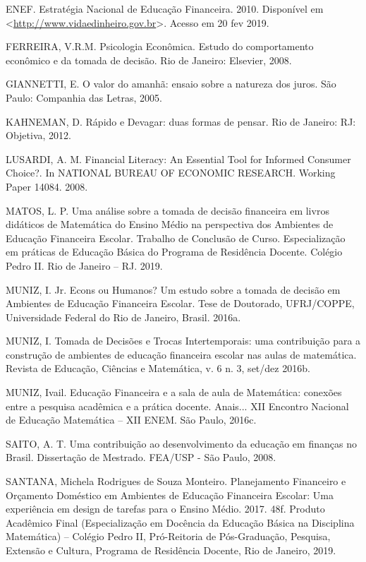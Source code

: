 ENEF. Estratégia Nacional de Educação Financeira. 2010. Disponível em <\url{http://www.vidaedinheiro.gov.br}>. Acesso em 20 fev 2019.

FERREIRA, V.R.M. Psicologia Econômica. Estudo do comportamento econômico e da tomada de decisão. Rio de Janeiro: Elsevier, 2008.

GIANNETTI, E. O valor do amanhã: ensaio sobre a natureza dos juros. São Paulo: Companhia das Letras, 2005.

KAHNEMAN, D. Rápido e Devagar: duas formas de pensar. Rio de Janeiro: RJ: Objetiva, 2012.

LUSARDI, A. M. Financial Literacy: An Essential Tool for Informed Consumer Choice?. In NATIONAL BUREAU OF ECONOMIC RESEARCH. Working Paper 14084. 2008.

MATOS, L. P. Uma análise sobre a tomada de decisão financeira em livros didáticos de Matemática do Ensino Médio na perspectiva dos Ambientes de Educação Financeira Escolar. Trabalho de Conclusão de Curso. Especialização em práticas de Educação Básica do Programa de Residência Docente. Colégio Pedro II. Rio de Janeiro – RJ. 2019.

MUNIZ, I. Jr. Econs ou Humanos? Um estudo sobre a tomada de decisão em Ambientes de Educação Financeira Escolar. Tese de Doutorado, UFRJ/COPPE, Universidade Federal do Rio de Janeiro, Brasil. 2016a.

MUNIZ, I. Tomada de Decisões e Trocas Intertemporais: uma contribuição para a construção de ambientes de educação financeira escolar nas aulas de matemática. Revista de Educação, Ciências e Matemática, v. 6 n. 3, set/dez 2016b.

MUNIZ, Ivail. Educação Financeira e a sala de aula de Matemática: conexões entre a pesquisa acadêmica e a prática docente. Anais... XII Encontro Nacional de Educação Matemática – XII ENEM. São Paulo, 2016c.

SAITO, A. T. Uma contribuição ao desenvolvimento da educação em finanças no Brasil. Dissertação de Mestrado. FEA/USP - São Paulo, 2008.

SANTANA, Michela Rodrigues de Souza Monteiro. Planejamento Financeiro e Orçamento Doméstico em Ambientes de Educação Financeira Escolar: Uma experiência em design de tarefas para o Ensino Médio. 2017. 48f. Produto Acadêmico Final (Especialização em Docência da Educação Básica na Disciplina Matemática) – Colégio Pedro II, Pró-Reitoria de Pós-Graduação, Pesquisa, Extensão e Cultura, Programa de Residência Docente, Rio de Janeiro, 2019.

